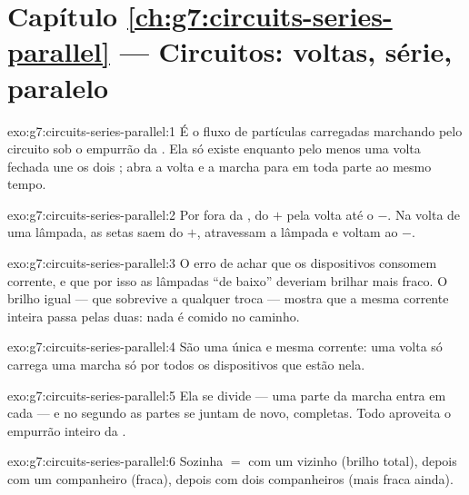 \section*{Capítulo \ref{ch:g7:circuits-series-parallel} --- Circuitos: voltas, série, paralelo}

\begin{solution}{exo:g7:circuits-series-parallel:1}
É o fluxo de partículas carregadas marchando pelo circuito sob o
empurrão da . Ela só existe enquanto pelo menos uma volta
fechada une os dois ; abra a volta e a marcha para em toda
parte ao mesmo tempo.
\end{solution}

\begin{solution}{exo:g7:circuits-series-parallel:2}
Por fora da , do $+$ pela volta até o $-$. Na volta de uma
lâmpada, as setas saem do $+$, atravessam a lâmpada e voltam ao $-$.
\end{solution}

\begin{solution}{exo:g7:circuits-series-parallel:3}
O erro de achar que os dispositivos consomem corrente, e que por isso
as lâmpadas ``de baixo'' deveriam brilhar mais fraco. O brilho igual
--- que sobrevive a qualquer troca --- mostra que a mesma corrente
inteira passa pelas duas: nada é comido no caminho.
\end{solution}

\begin{solution}{exo:g7:circuits-series-parallel:4}
São uma única e mesma corrente: uma volta só carrega uma marcha só
por todos os dispositivos que estão nela.
\end{solution}

\begin{solution}{exo:g7:circuits-series-parallel:5}
Ela se divide --- uma parte da marcha entra em cada  --- e no
segundo  as partes se juntam de novo, completas. Todo 
aproveita o empurrão inteiro da .
\end{solution}

\begin{solution}{exo:g7:circuits-series-parallel:6}
Sozinha $=$ com um vizinho  (brilho total), depois com um
companheiro  (fraca), depois com dois companheiros 
(mais fraca ainda).
\end{solution}


